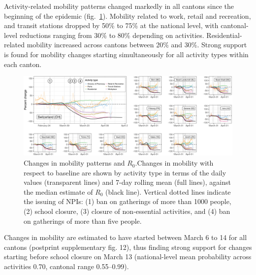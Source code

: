 Activity-related mobility patterns changed markedly in all cantons since the beginning of the epidemic (fig.~\ref{fig:covid-ch-mobility}). Mobility related to work, retail and recreation, and transit stations dropped by 50\% to 75\% at the national level, with cantonal-level reductions ranging from 30\% to 80\% depending on activities. Residential-related mobility increased across cantons between 20\% and 30\%. Strong support is found for mobility changes starting simultaneously for all activity types within each canton. 
\begin{figure}\centering
  \includegraphics{fig_covid-switzerland-npi/FIGURE_3.png}
  \caption[Changes in mobility patterns and $R_0$]{Changes in mobility patterns and $R_0$.Changes in mobility with respect to baseline are shown by activity type in terms of the daily values (transparent lines) and 7-day rolling mean (full lines), against the median estimate of $R_0$ (black line). Vertical dotted lines indicate the issuing of NPIs: (1) ban on gatherings of more than 1000 people, (2) school closure, (3) closure of non-essential activities, and (4) ban on gatherings of more than five people.}
  \label{fig:covid-ch-mobility}
\end{figure}
Changes in mobility are estimated to have started between March 6 to 14 for all cantons (postprint supplementary fig. 12), thus finding strong support for changes starting before school closure on March 13 (national-level mean probability across activities 0.70, cantonal range 0.55–0.99). 

